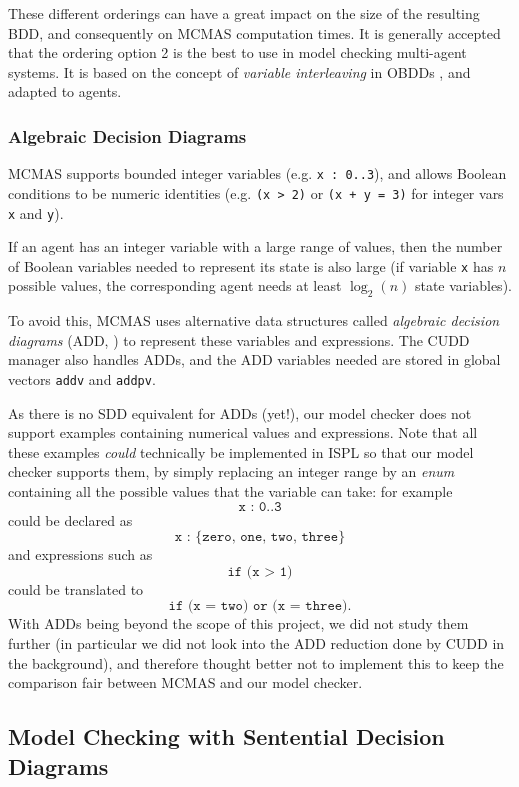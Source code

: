 \documentclass[11pt]{article}
\begin{document}
These different orderings can have a great impact on the size of the resulting BDD, and consequently on MCMAS computation times. It is generally accepted that the ordering option 2 is the best to use in model checking multi-agent systems. It is based on the concept of \textit{variable interleaving} in OBDDs \cite{interleaving}, and adapted to agents.


\subsubsection{Algebraic Decision Diagrams}
\label{algebraic_decision_diagrams}

MCMAS supports bounded integer variables (e.g. \texttt{x : 0..3}), and allows Boolean conditions to be numeric identities (e.g. \texttt{(x > 2)} or \texttt{(x + y = 3)} for integer vars \texttt{x} and \texttt{y}). 

If an agent has an integer variable with a large range of values, then the number of Boolean variables needed to represent its state is also large (if variable \texttt{x} has $n$ possible values, the corresponding agent needs at least $\log_2(n)$ state variables). 

To avoid this, MCMAS uses alternative data structures called \textit{algebraic decision diagrams} (ADD, \cite{add}) to represent these variables and expressions. The CUDD manager also handles ADDs, and the ADD variables needed are stored in global vectors \texttt{addv} and \texttt{addpv}.

As there is no SDD equivalent for ADDs (yet!), our model checker does not support examples containing numerical values and expressions.
Note that all these examples \textit{could} technically be implemented in ISPL so that our model checker supports them, by simply replacing an integer range by an \textit{enum} containing all the possible values that the variable can take: for example 
$$\texttt{x : 0..3} $$
could be declared as $$\texttt{x : \{zero, one, two, three\}}$$
and expressions such as $$\texttt{if (x > 1)}$$ could be translated to $$\texttt{if (x = two) or (x = three)}.$$
With ADDs being beyond the scope of this project, we did not study them further (in particular we did not look into the ADD reduction done by CUDD in the background), and therefore thought better not to implement this to keep the comparison fair between MCMAS and our model checker. 

\subsection{Model Checking with Sentential Decision Diagrams}
\end{document}
